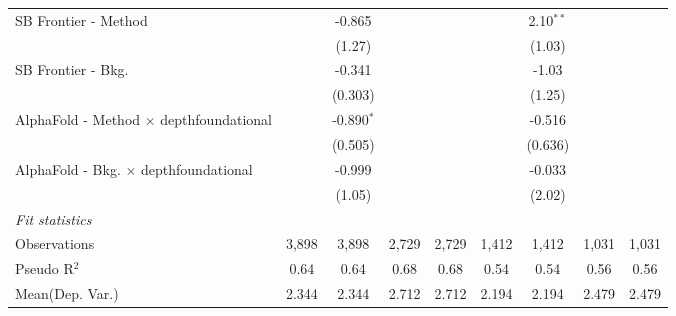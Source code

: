 \begin{tabular}{lcccccccc}
   SB Frontier - Method                           &              & -0.865        &       &       &               & 2.10$^{**}$   &       &   \\   
                                                  &              & (1.27)        &       &       &               & (1.03)        &       &   \\   
   SB Frontier - Bkg.                             &              & -0.341        &       &       &               & -1.03         &       &   \\   
                                                  &              & (0.303)       &       &       &               & (1.25)        &       &   \\   
   AlphaFold - Method $\times$ depthfoundational  &              & -0.890$^{*}$  &       &       &               & -0.516        &       &   \\   
                                                  &              & (0.505)       &       &       &               & (0.636)       &       &   \\   
   AlphaFold - Bkg. $\times$ depthfoundational    &              & -0.999        &       &       &               & -0.033        &       &   \\   
                                                  &              & (1.05)        &       &       &               & (2.02)        &       &   \\   
   \midrule
   \emph{Fit statistics}\\
   Observations                                   & 3,898        & 3,898         & 2,729 & 2,729 & 1,412         & 1,412         & 1,031 & 1,031\\  
   Pseudo R$^2$                                   & 0.64         & 0.64          & 0.68  & 0.68  & 0.54          & 0.54          & 0.56  & 0.56\\  
Mean(Dep. Var.) & 2.344 & 2.344 & 2.712 & 2.712 & 2.194 & 2.194 & 2.479 & 2.479 \\
   

\end{tabular}
